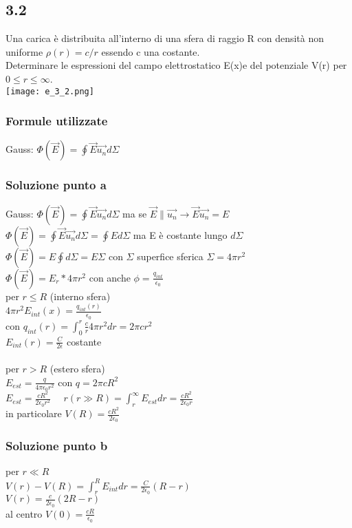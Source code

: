 \documentclass[../../main.tex]{subfiles}
\begin{document}
\subsection*{3.2}
Una carica è distribuita all'interno di una sfera di raggio R con densità non uniforme $\rho (r) = c / r$ essendo c una costante.
\\Determinare le espressioni del campo elettrostatico E(x)e del potenziale V(r) per $0 \le r \le \infty$.
\\\texttt{[image: e\_3\_2.png]}
\subsubsection*{Formule utilizzate}
Gauss: $\Phi(\vec{E}) = \oint\vec{E}\vec{u_n}d\Sigma$
\subsubsection*{Soluzione punto a}
Gauss: $\Phi(\vec{E}) = \oint\vec{E}\vec{u_n}d\Sigma$ ma se $\vec{E} \parallel \vec{u_n} \rightarrow  \vec{E}\vec{u_n} = E$
\\$\Phi(\vec{E}) = \oint\vec{E}\vec{u_n}d\Sigma = \oint Ed\Sigma$ ma E è costante lungo $d\Sigma$
\\$\Phi(\vec{E}) = E\oint d\Sigma = E\Sigma$ con $\Sigma$ superfice sferica $\Sigma = 4\pi r^2$ 
\\$\Phi(\vec{E}) = E_r * 4\pi r^2$ con anche $\phi = \frac{q_{int}}{\epsilon_0}$
\\per $r \le R$ (interno sfera)
\\$4\pi r^2 E_{int} (x) = \frac{q_{int}(r)}{\epsilon_0}$
\\con $q_{int}(r) = \int_0^r \frac{c}{r}4\pi r^2dr = 2\pi cr^2$
\\$E_{int}(r) = \frac{C}{2\epsilon}$ costante
\\\\per $r > R$ (estero sfera)
\\$E_{est} = \frac{q}{4\pi \epsilon_0 r^2}$ con $q = 2\pi cR^2$
\\$E_{est} = \frac{cR^2}{2\epsilon_0 r^2}\ \ \ \ \ \ r(r \gg R) = \int_r^\infty E_{est}dr = \frac{cR^2}{2\epsilon_0 r}$
\\in particolare $V(R) = \frac{cR^2}{2\epsilon_0}$
\subsubsection*{Soluzione punto b}
per $ r\ll R$
\\$V(r) - V(R) = \int^R_rE_{int}dr = \frac{C}{2\epsilon_0}(R-r)$
\\$V(r) = \frac{c}{2\epsilon_0}(2R-r)$
\\al centro $V(0) = \frac{cR}{\epsilon_0}$ 
\newpage
\end{document}
